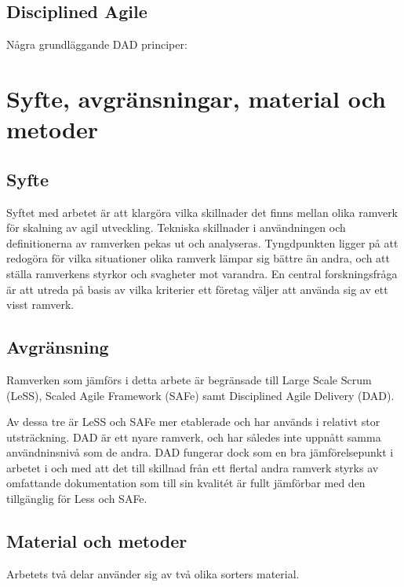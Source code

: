 	
	\subsection{Disciplined Agile}
	
	
	Några grundläggande DAD principer: \cite{dad_principles}
		
	\newpage

\section{Syfte, avgränsningar, material och metoder}
	
	
	\subsection{Syfte}
	
	Syftet med arbetet är att klargöra vilka skillnader det finns mellan olika ramverk för skalning av agil utveckling. Tekniska skillnader i användningen och definitionerna av ramverken pekas ut och analyseras.
	Tyngdpunkten ligger på att redogöra för vilka situationer olika ramverk lämpar sig bättre än andra, och att ställa ramverkens styrkor och svagheter mot varandra. \newline
	En central forskningsfråga är att utreda på basis av vilka kriterier ett företag väljer att använda sig av ett visst ramverk.
	
	
	
	
	\subsection{Avgränsning}
	
	Ramverken som jämförs i detta arbete är begränsade till Large Scale Scrum (LeSS), Scaled Agile Framework (SAFe) samt Disciplined Agile Delivery (DAD).
	
	Av dessa tre är LeSS och SAFe mer etablerade och har används i relativt stor utsträckning. DAD är ett nyare ramverk, och har således inte uppnått samma användninsnivå som de andra. DAD fungerar dock som en bra jämförelsepunkt i arbetet i och med att det till skillnad från ett flertal andra ramverk styrks av omfattande dokumentation som till sin kvalitét är fullt jämförbar med den tillgänglig för Less och SAFe. \cite{ask_matrix}
	
	
	\subsection{Material och metoder}
	Arbetets två delar använder sig av två olika sorters material.
	
